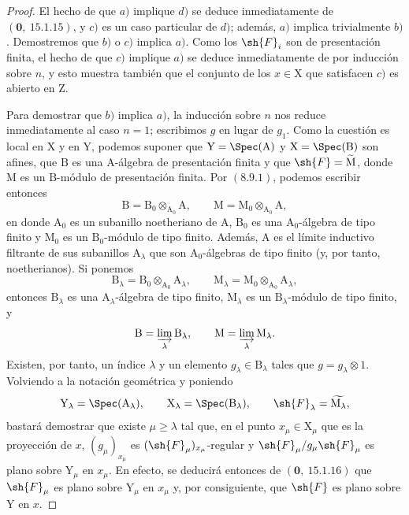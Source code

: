 \begin{proof}
El hecho de que $a)$ implique $d)$ se deduce inmediatamente de $(\mathbf{0},~15.1.15)$, y $c)$ es un caso particular de $d)$; además, $a)$ implica trivialmente $b)$. Demostremos que $b)$ o $c)$ implica $a)$. Como los $\sh{F}_i$ son de presentación finita, el hecho de que $c)$ implique $a)$ se deduce inmediatamente de  por inducción sobre $n$, y esto muestra también que el conjunto de los $x\in\mathrm{X}$ que satisfacen $c)$ es abierto en $\mathrm{Z}$.

Para demostrar que $b)$ implica $a)$, la inducción sobre $n$ nos reduce inmediatamente al caso $n=1$; escribimos $g$ en lugar de $g_1$. Como la cuestión es local en $\mathrm{X}$ y en $\mathrm{Y}$, podemos suponer que $\mathrm{Y}=\Spec(\mathrm{A})$ y $\mathrm{X}=\Spec(\mathrm{B})$ son afines, que $\mathrm{B}$ es una $\mathrm{A}$-álgebra de presentación finita y que $\sh{F}=\widetilde{\mathrm{M}}$, donde $\mathrm{M}$ es un $\mathrm{B}$-módulo de presentación finita. Por $(8.9.1)$, podemos escribir entonces
\[
  \mathrm{B}=\mathrm{B}_0\otimes_{\mathrm{A}_0}\mathrm{A},
  \qquad
  \mathrm{M}=\mathrm{M}_0\otimes_{\mathrm{A}_0}\mathrm{A},
\]
en donde $\mathrm{A}_0$ es un subanillo noetheriano de $\mathrm{A}$, $\mathrm{B}_0$ es una $\mathrm{A}_0$-álgebra de tipo finito y $\mathrm{M}_0$ es un $\mathrm{B}_0$-módulo de tipo finito. Además, $\mathrm{A}$ es el límite inductivo filtrante de sus subanillos $\mathrm{A}_\lambda$ que son $\mathrm{A}_0$-álgebras de tipo finito (y, por tanto, noetherianos). Si ponemos
\[
  \mathrm{B}_\lambda=\mathrm{B}_0\otimes_{\mathrm{A}_0}\mathrm{A}_\lambda,
  \qquad
  \mathrm{M}_\lambda=\mathrm{M}_0\otimes_{\mathrm{A}_0}\mathrm{A}_\lambda,
\]
entonces $\mathrm{B}_\lambda$ es una $\mathrm{A}_\lambda$-álgebra de tipo finito, $\mathrm{M}_\lambda$ es un $\mathrm{B}_\lambda$-módulo de tipo finito, y
\[
  \mathrm{B}=\varinjlim_\lambda\mathrm{B}_\lambda,
  \qquad
  \mathrm{M}=\varinjlim_\lambda\mathrm{M}_\lambda.
\]
Existen, por tanto, un índice $\lambda$ y un elemento $g_\lambda\in\mathrm{B}_\lambda$ tales que $g=g_\lambda\otimes 1$. Volviendo a la notación geométrica y poniendo
\[
  \mathrm{Y}_\lambda=\Spec(\mathrm{A}_\lambda),
  \qquad
  \mathrm{X}_\lambda=\Spec(\mathrm{B}_\lambda),
  \qquad
  \sh{F}_\lambda=\widetilde{\mathrm{M}_\lambda},
\]
bastará demostrar que existe $\mu\geqslant\lambda$ tal que, en el punto $x_\mu\in\mathrm{X}_\mu$ que es la proyección de $x$, $(g_\mu)_{x_\mu}$ es $(\sh{F}_\mu)_{x_\mu}$-regular y $\sh{F}_\mu/g_\mu\sh{F}_\mu$ es plano sobre $\mathrm{Y}_\mu$ en $x_\mu$. En efecto, se deducirá entonces de $(\mathbf{0},~15.1.16)$ que $\sh{F}_\mu$ es plano sobre $\mathrm{Y}_\mu$ en $x_\mu$ y, por consiguiente, que $\sh{F}$ es plano sobre $\mathrm{Y}$ en $x$.


\end{proof}
